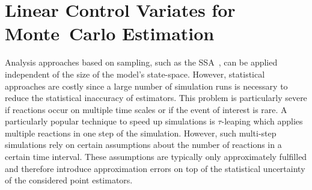 \chapter{Linear Control Variates for Monte~Carlo \mbox{Estimation}}\label{ch:cvinsrns}
% 

Analysis approaches based on sampling, such as the \acf{SSA}~\parencite{gillespie1977exact}, can  be applied
independent of the size of the model's state-space. 
However, statistical approaches are costly since a large number
of simulation runs is necessary to reduce the statistical 
inaccuracy of estimators. This problem is particularly severe
if reactions occur on multiple time scales or if the event of interest is rare.
A particularly popular technique to speed up simulations is $\tau$-leaping which applies
multiple reactions in one step of the simulation.
However, such multi-step simulations rely on certain assumptions about
the number of reactions in a certain time interval. These assumptions
are typically only approximately fulfilled and therefore introduce  approximation
errors on top of the statistical uncertainty of the considered point estimators.

